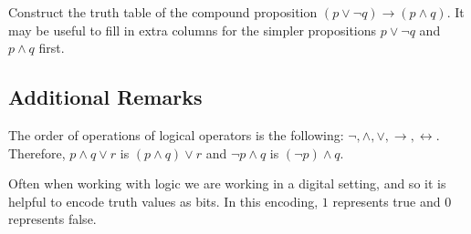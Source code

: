 \exercise Construct the truth table of the compound proposition
$(p\vee\neg q)\rightarrow (p\wedge q)$. It may be useful to fill in
extra columns for the simpler propositions $p\vee\neg q$ and
$p\wedge q$ first.

\subsection{Additional Remarks}
The order of operations of logical operators is the following:
$\neg,\wedge,\vee,\rightarrow,\leftrightarrow$. Therefore,
$p\wedge q\vee r$ is $(p\wedge q)\vee r$ and $\neg p\wedge q$ is
$(\neg p)\wedge q$.

Often when working with logic we are working in a
digital setting, and so it is helpful to encode truth values as
bits. In this encoding, $1$ represents true and $0$ represents false.

